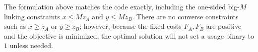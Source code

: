 The formulation above matches the code exactly, including the one-sided big-\(M\) linking constraints \(x \le M z_A\) and \(y \le M z_B\). There are no converse constraints such as \(x \ge z_A\) or \(y \ge z_B\); however, because the fixed costs \(F_A,F_B\) are positive and the objective is minimized, the optimal solution will not set a usage binary to \(1\) unless needed.
